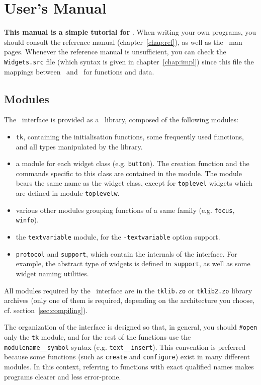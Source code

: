 \chapter{User's Manual}
{\bf This manual is a simple tutorial for \camltk }.  When writing your own
programs, you should consult the reference manual
(chapter~\ref{chap:ref}), as well as the \tk\ man pages.  Whenever the
reference manual is unsufficient, you can check the \verb|Widgets.src| file
(which syntax is given in chapter~\ref{chap:impl}) since this file the
mappings between \tk\ and \caml\ for functions and data. 

\section{Modules}
The \camltk\ interface is provided as a \caml\ library, composed of the
following modules:

\begin{itemize}
\item \verb|tk|, containing the initialisation functions, some frequently
used functions, and all types manipulated by the library.

\item a module for each widget class (e.g. \verb|button|). The creation
function and the commands specific to this class are contained in the
module. The module bears the same name as the widget class, except for
\verb|toplevel| widgets which are defined in module \verb|toplevelw|.

\item various other modules grouping functions of a same family
(e.g. \verb|focus|, \verb|winfo|). 

\item the \verb|textvariable| module, for the \verb|-textvariable| option
support. 

\item \verb|protocol| and \verb|support|, which contain the internals
of the interface. For example, the abstract type of widgets is defined in
\verb|support|, as well as some widget naming utilities.
\end{itemize} 

All modules required by the \camltk\ interface are in the \verb|tklib.zo|
or \verb|tklib2.zo| library archives (only one of them is required,
depending on the architecture you choose, cf. section~\ref{sec:compiling}).

The organization of the interface is designed so that, in general, you
should \verb|#open| only the \verb|tk| module, and for the 
rest of the functions use the \verb|modulename__symbol| syntax (e.g.
\verb|text__insert|).
This convention is preferred because some functions (such as \verb|create|
and \verb|configure|) exist in many different modules. In this context,
referring to functions with exact qualified names makes programs clearer and
less error-prone.


